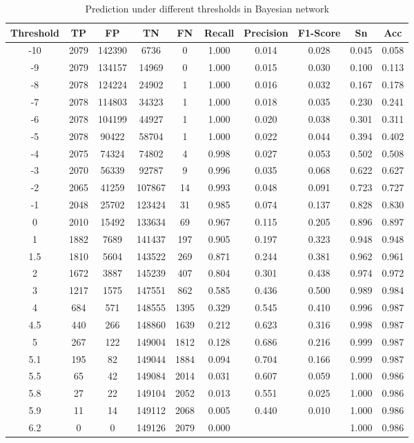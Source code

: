 \documentclass{gapd}
\begin{document}
\begin{table}
  \centering
  \caption{Prediction under different thresholds in Bayesian network}
  \begin{tabular}{cccccccccc}
  \hline
\toprule%
      Threshold & TP & FP & TN & FN & Recall & Precision & F1-Score & Sn & Acc \\ 
\midrule%
      -10 & 2079 & 142390 & 6736 & 0 & 1.000 & 0.014 & 0.028 & 0.045 & 0.058 \\ 
      -9 & 2079 & 134157 & 14969 & 0 & 1.000 & 0.015 & 0.030 & 0.100 & 0.113 \\ 
      -8 & 2078 & 124224 & 24902 & 1 & 1.000 & 0.016 & 0.032 & 0.167 & 0.178 \\ 
      -7 & 2078 & 114803 & 34323 & 1 & 1.000 & 0.018 & 0.035 & 0.230 & 0.241 \\ 
      -6 & 2078 & 104199 & 44927 & 1 & 1.000 & 0.020 & 0.038 & 0.301 & 0.311 \\ 
      -5 & 2078 & 90422 & 58704 & 1 & 1.000 & 0.022 & 0.044 & 0.394 & 0.402 \\ 
      -4 & 2075 & 74324 & 74802 & 4 & 0.998 & 0.027 & 0.053 & 0.502 & 0.508 \\ 
      -3 & 2070 & 56339 & 92787 & 9 & 0.996 & 0.035 & 0.068 & 0.622 & 0.627 \\ 
      -2 & 2065 & 41259 & 107867 & 14 & 0.993 & 0.048 & 0.091 & 0.723 & 0.727 \\ 
      -1 & 2048 & 25702 & 123424 & 31 & 0.985 & 0.074 & 0.137 & 0.828 & 0.830 \\ 
      0 & 2010 & 15492 & 133634 & 69 & 0.967 & 0.115 & 0.205 & 0.896 & 0.897 \\ 
      1 & 1882 & 7689 & 141437 & 197 & 0.905 & 0.197 & 0.323 & 0.948 & 0.948 \\ 
      1.5 & 1810 & 5604 & 143522 & 269 & 0.871 & 0.244 & 0.381 & 0.962 & 0.961 \\ 
      2 & 1672 & 3887 & 145239 & 407 & 0.804 & 0.301 & 0.438 & 0.974 & 0.972 \\ 
      3 & 1217 & 1575 & 147551 & 862 & 0.585 & 0.436 & 0.500 & 0.989 & 0.984 \\ 
      4 & 684 & 571 & 148555 & 1395 & 0.329 & 0.545 & 0.410 & 0.996 & 0.987 \\ 
      4.5 & 440 & 266 & 148860 & 1639 & 0.212 & 0.623 & 0.316 & 0.998 & 0.987 \\ 
      5 & 267 & 122 & 149004 & 1812 & 0.128 & 0.686 & 0.216 & 0.999 & 0.987 \\ 
      5.1 & 195 & 82 & 149044 & 1884 & 0.094 & 0.704 & 0.166 & 0.999 & 0.987 \\ 
      5.5 & 65 & 42 & 149084 & 2014 & 0.031 & 0.607 & 0.059 & 1.000 & 0.986 \\ 
      5.8 & 27 & 22 & 149104 & 2052 & 0.013 & 0.551 & 0.025 & 1.000 & 0.986 \\ 
      5.9 & 11 & 14 & 149112 & 2068 & 0.005 & 0.440 & 0.010 & 1.000 & 0.986 \\ 
      6.2 & 0 & 0 & 149126 & 2079 & 0.000 &  &  & 1.000 & 0.986 \\ 
\bottomrule%
  \end{tabular}
\end{table}
\end{document}
